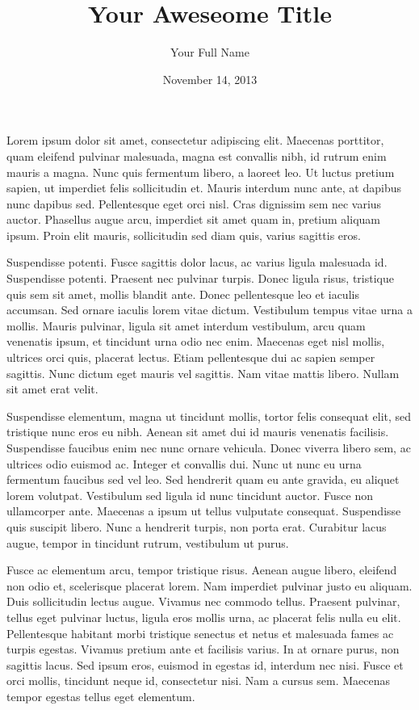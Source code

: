 \documentclass{sblhs-essay}
\author{Your Full Name}
\date{November 14, 2013}
\title{Your Aweseome Title}
\begin{document}
	\maketitle


Lorem ipsum dolor sit amet, consectetur adipiscing elit. Maecenas porttitor, quam eleifend pulvinar malesuada, magna est convallis nibh, id rutrum enim mauris a magna. Nunc quis fermentum libero, a laoreet leo. Ut luctus pretium sapien, ut imperdiet felis sollicitudin et. Mauris interdum nunc ante, at dapibus nunc dapibus sed. Pellentesque eget orci nisl. Cras dignissim sem nec varius auctor. Phasellus augue arcu, imperdiet sit amet quam in, pretium aliquam ipsum. Proin elit mauris, sollicitudin sed diam quis, varius sagittis eros.

Suspendisse potenti. Fusce sagittis dolor lacus, ac varius ligula malesuada id. Suspendisse potenti. Praesent nec pulvinar turpis. Donec ligula risus, tristique quis sem sit amet, mollis blandit ante. Donec pellentesque leo et iaculis accumsan. Sed ornare iaculis lorem vitae dictum. Vestibulum tempus vitae urna a mollis. Mauris pulvinar, ligula sit amet interdum vestibulum, arcu quam venenatis ipsum, et tincidunt urna odio nec enim. Maecenas eget nisl mollis, ultrices orci quis, placerat lectus. Etiam pellentesque dui ac sapien semper sagittis. Nunc dictum eget mauris vel sagittis. Nam vitae mattis libero. Nullam sit amet erat velit.

Suspendisse elementum, magna ut tincidunt mollis, tortor felis consequat elit, sed tristique nunc eros eu nibh. Aenean sit amet dui id mauris venenatis facilisis. Suspendisse faucibus enim nec nunc ornare vehicula. Donec viverra libero sem, ac ultrices odio euismod ac. Integer et convallis dui. Nunc ut nunc eu urna fermentum faucibus sed vel leo. Sed hendrerit quam eu ante gravida, eu aliquet lorem volutpat. Vestibulum sed ligula id nunc tincidunt auctor. Fusce non ullamcorper ante. Maecenas a ipsum ut tellus vulputate consequat. Suspendisse quis suscipit libero. Nunc a hendrerit turpis, non porta erat. Curabitur lacus augue, tempor in tincidunt rutrum, vestibulum ut purus.

Fusce ac elementum arcu, tempor tristique risus. Aenean augue libero, eleifend non odio et, scelerisque placerat lorem. Nam imperdiet pulvinar justo eu aliquam. Duis sollicitudin lectus augue. Vivamus nec commodo tellus. Praesent pulvinar, tellus eget pulvinar luctus, ligula eros mollis urna, ac placerat felis nulla eu elit. Pellentesque habitant morbi tristique senectus et netus et malesuada fames ac turpis egestas. Vivamus pretium ante et facilisis varius. In at ornare purus, non sagittis lacus. Sed ipsum eros, euismod in egestas id, interdum nec nisi. Fusce et orci mollis, tincidunt neque id, consectetur nisi. Nam a cursus sem. Maecenas tempor egestas tellus eget elementum.
\end{document}
